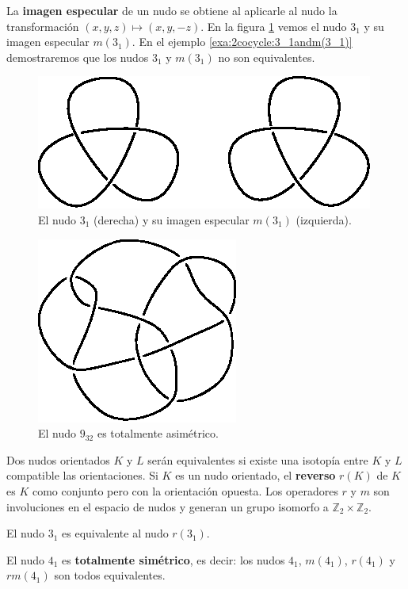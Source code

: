 \documentclass[graybox]{svmult}
\newcommand{\Z}{\mathbb{Z}}
\begin{document}
La \textbf{imagen especular} de un nudo se obtiene al aplicarle al nudo la
transformación $(x,y,z)\mapsto(x,y,-z)$.  En la figura
\ref{fig:trefoil_and_mirror} vemos el nudo $3_1$ y su imagen especular
$m(3_1)$. En el ejemplo \ref{exa:2cocycle:3_1andm(3_1)} demostraremos que los nudos
$3_1$ y $m(3_1)$ no son equivalentes. 
\begin{figure}[ht]
	\centering
		\includegraphics[scale=0.7]{images/trefoil_and_mirror}
		\caption{El nudo $3_1$ (derecha) y su imagen especular $m(3_1)$
		(izquierda).}
		\label{fig:trefoil_and_mirror}
\end{figure}
\begin{figure}[ht]
		\centering
		\includegraphics[scale=0.7]{images/9_32}
		\caption{El nudo $9_{32}$ es totalmente asimétrico.}
		\label{fig:9_32}
\end{figure}

Dos nudos orientados $K$ y $L$ serán equivalentes si existe una isotopía
entre $K$ y $L$ compatible las orientaciones.  Si $K$ es un nudo orientado, el
\textbf{reverso} $r(K)$ de $K$ es $K$ como conjunto pero con la orientación
opuesta. Los operadores $r$ y $m$ son involuciones en el espacio de nudos y
generan un grupo isomorfo a $\Z_2\times\Z_2$.

\begin{example}
	El nudo $3_1$ es equivalente al nudo $r(3_1)$. 
\end{example}

\begin{example}
	El nudo $4_1$ es
	\textbf{totalmente simétrico}, es decir: los nudos $4_1$, $m(4_1)$,
	$r(4_1)$ y $rm(4_1)$ son todos equivalentes.  
\end{example}
\end{document}
